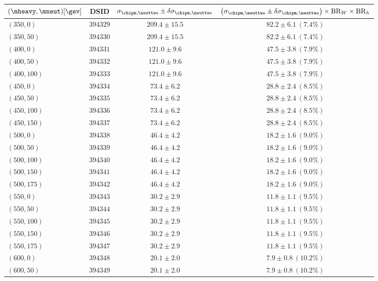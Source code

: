 \begin{table}[h]
\footnotesize
\begin{center}\renewcommand\arraystretch{1.6}
\begin{tabular}{|l|c|c|c|}
\toprule
$(\mheavy, \mneut) [\gev]$ & DSID & $\sigma_{\chipm,\neuttwo} \pm \delta \sigma_{\chipm,\neuttwo}$ & $\left(\sigma_{\chipm,\neuttwo} \pm \delta \sigma_{\chipm,\neuttwo}\right)\times\mathrm{BR}_{W}\times\mathrm{BR}_{h}$ \\
\midrule
$(350,0)$ & $394329$ & $209.4\pm15.5$ & $82.2\pm6.1~(7.4\%)$ \\
$(350,50)$ & $394330$ & $209.4\pm15.5$ & $82.2\pm6.1~(7.4\%)$ \\
$(400,0)$ & $394331$ & $121.0\pm9.6$ & $47.5\pm3.8~(7.9\%)$ \\
$(400,50)$ & $394332$ & $121.0\pm9.6$ & $47.5\pm3.8~(7.9\%)$ \\
$(400,100)$ & $394333$ & $121.0\pm9.6$ & $47.5\pm3.8~(7.9\%)$ \\
$(450,0)$ & $394334$ & $73.4\pm6.2$ & $28.8\pm2.4~(8.5\%)$ \\
$(450,50)$ & $394335$ & $73.4\pm6.2$ & $28.8\pm2.4~(8.5\%)$ \\
$(450,100)$ & $394336$ & $73.4\pm6.2$ & $28.8\pm2.4~(8.5\%)$ \\
$(450,150)$ & $394337$ & $73.4\pm6.2$ & $28.8\pm2.4~(8.5\%)$ \\
$(500,0)$ & $394338$ & $46.4\pm4.2$ & $18.2\pm1.6~(9.0\%)$ \\
$(500,50)$ & $394339$ & $46.4\pm4.2$ & $18.2\pm1.6~(9.0\%)$ \\
$(500,100)$ & $394340$ & $46.4\pm4.2$ & $18.2\pm1.6~(9.0\%)$ \\
$(500,150)$ & $394341$ & $46.4\pm4.2$ & $18.2\pm1.6~(9.0\%)$ \\
$(500,175)$ & $394342$ & $46.4\pm4.2$ & $18.2\pm1.6~(9.0\%)$ \\
$(550,0)$ & $394343$ & $30.2\pm2.9$ & $11.8\pm1.1~(9.5\%)$ \\
$(550,50)$ & $394344$ & $30.2\pm2.9$ & $11.8\pm1.1~(9.5\%)$ \\
$(550,100)$ & $394345$ & $30.2\pm2.9$ & $11.8\pm1.1~(9.5\%)$ \\
$(550,150)$ & $394346$ & $30.2\pm2.9$ & $11.8\pm1.1~(9.5\%)$ \\
$(550,175)$ & $394347$ & $30.2\pm2.9$ & $11.8\pm1.1~(9.5\%)$ \\
$(600,0)$ & $394348$ & $20.1\pm2.0$ & $7.9\pm0.8~(10.2\%)$ \\
$(600,50)$ & $394349$ & $20.1\pm2.0$ & $7.9\pm0.8~(10.2\%)$ \\

\end{tabular}
\end{center}
\end{table}
